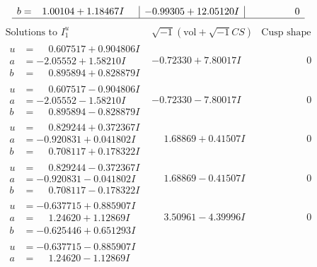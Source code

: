 \documentclass[1p]{elsarticle_modified}
\theoremstyle{definition}
\newcommand{\I}{\sqrt{-1}}
\begin{document}
$$\begin{array}{c|c|c}
\begin{aligned}
b &= \phantom{-}1.00104 + 1.18467 I\end{aligned}
 & -0.99305 + 12.05120 I & \phantom{-0.000000 } 0\\
 \hline 
 \end{array}$$\newpage$$\begin{array}{c|c|c}  
\text{Solutions to }I^u_{1}& \I (\text{vol} + \sqrt{-1}CS) & \text{Cusp shape}\\
 \hline 
\begin{aligned}
u &= \phantom{-}0.607517 + 0.904806 I \\
a &= -2.05552 + 1.58210 I \\
b &= \phantom{-}0.895894 + 0.828879 I\end{aligned}
 & -0.72330 + 7.80017 I & \phantom{-0.000000 } 0 \\ \hline\begin{aligned}
u &= \phantom{-}0.607517 - 0.904806 I \\
a &= -2.05552 - 1.58210 I \\
b &= \phantom{-}0.895894 - 0.828879 I\end{aligned}
 & -0.72330 - 7.80017 I & \phantom{-0.000000 } 0 \\ \hline\begin{aligned}
u &= \phantom{-}0.829244 + 0.372367 I \\
a &= -0.920831 + 0.041802 I \\
b &= \phantom{-}0.708117 + 0.178322 I\end{aligned}
 & \phantom{-}1.68869 + 0.41507 I & \phantom{-0.000000 } 0 \\ \hline\begin{aligned}
u &= \phantom{-}0.829244 - 0.372367 I \\
a &= -0.920831 - 0.041802 I \\
b &= \phantom{-}0.708117 - 0.178322 I\end{aligned}
 & \phantom{-}1.68869 - 0.41507 I & \phantom{-0.000000 } 0 \\ \hline\begin{aligned}
u &= -0.637715 + 0.885907 I \\
a &= \phantom{-}1.24620 + 1.12869 I \\
b &= -0.625446 + 0.651293 I\end{aligned}
 & \phantom{-}3.50961 - 4.39996 I & \phantom{-0.000000 } 0 \\ \hline\begin{aligned}
u &= -0.637715 - 0.885907 I \\
a &= \phantom{-}1.24620 - 1.12869 I \\

\end{aligned}
\end{array}$$
\end{document}
